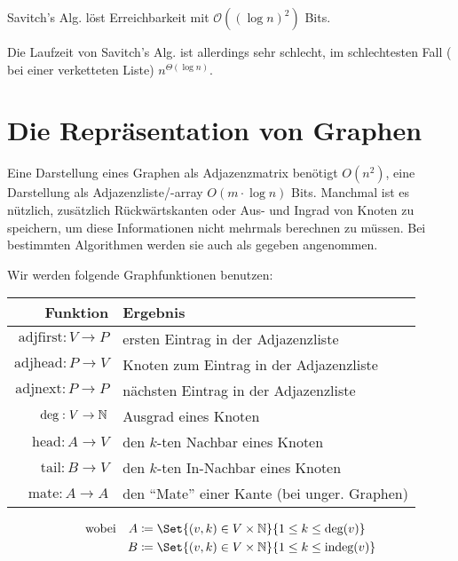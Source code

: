 \documentclass{cheat-sheet}
\renewcommand{\O}{\mathcal{O}} %
\begin{document}
\begin{lem}
  Savitch's Alg. löst Erreichbarkeit mit $\O((\log n)^2)$ Bits.
\end{lem}

\begin{samepage}

\begin{bem}
  Die Laufzeit von Savitch's Alg. ist allerdings sehr schlecht, im schlechtesten Fall (\zB{} bei einer verketteten Liste) $n^{\Theta(\log n)}$.
\end{bem}


\section{Die Repräsentation von Graphen}

\end{samepage}


\begin{bem}
  Eine Darstellung eines Graphen als Adjazenzmatrix benötigt $O(n^2)$, eine Darstellung als Adjazenzliste/-array $O(m \cdot \log n)$ Bits.
  Manchmal ist es nützlich, zusätzlich Rückwärtskanten oder Aus- und Ingrad von Knoten zu speichern, um diese Informationen nicht mehrmals berechnen zu müssen. Bei bestimmten Algorithmen werden sie auch als gegeben angenommen.
\end{bem}


\begin{konv}
  Wir werden folgende Graphfunktionen benutzen:
  
  \begin{tabular}{r l}
    Funktion & Ergebnis \\[3pt] \hline
    $\text{adjfirst} : V \to P$ & ersten Eintrag in der Adjazenzliste \\
    $\text{adjhead} : P \to V$ & Knoten zum Eintrag in der Adjazenzliste \\
    $\text{adjnext} : P \to P$ & nächsten Eintrag in der Adjazenzliste \\
    $\text{deg} : V \to \mathbb{N}$ & Ausgrad eines Knoten \\
    $\text{head} : A \to V$ & den $k$-ten Nachbar eines Knoten \\
    $\text{tail} : B \to V$ & den $k$-ten In-Nachbar eines Knoten \\
    $\text{mate} : A \to A$ & den "`Mate"' einer Kante (bei unger. Graphen)
  \end{tabular}
  \begin{align*}
    \text{wobei} \quad
    A &\coloneqq \Set{(v, k) \in V \times \N}{1 \leq k \leq \text{deg}(v)} \\
    B &\coloneqq \Set{(v, k) \in V \times \N}{1 \leq k \leq \text{indeg}(v)}
  \end{align*}
\end{konv}
\end{document}
